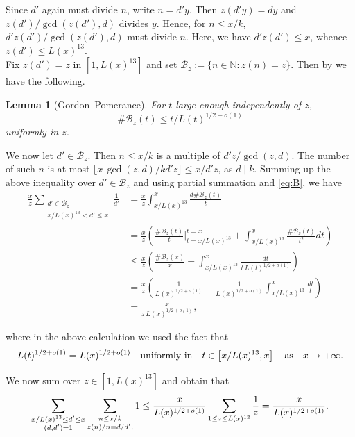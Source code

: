 \documentclass[12pt,a4paper,oneside]{amsart}
\newtheorem{lemma}[theorem]{Lemma}
\begin{document}
Since $d'$ again must divide $n$, write $n = d'y.$
Then $z(d'y) = dy$ and $z(d')/ \gcd(z(d'),d)$ divides $y$.
Hence, for $n \le x/k$, $d'z(d')/\gcd(z(d'),d)$ must divide $n.$
Here, we have $d'z(d')\le x$, whence $z(d')\le L(x)^{13}$. \\Fix $z(d')=z$ in $\left[1,L(x)^{13}\right]$ and set ${\mathcal B}_z:=\{n \in \mathbb N: z(n)=z\}.$ Then by \cite[Th. 3]{GP91} we have the following.
\begin{lemma}[Gordon--Pomerance]\label{gp}
For $t$ large enough independently of $z$,
\begin{equation}\label{eq:B}
\# \mathcal B_z(t) \le t/L(t)^{1/2+o(1)}
\end{equation}
uniformly in $z$.
\end{lemma}


We now let $d'\in {\mathcal B}_z$. Then $n\le x/k$ is a multiple of $d'z/\gcd(z,d)$. The  number of such $n$ is at most $\lfloor x\,\gcd(z,d)/kd'z\rfloor\le x/d'z$, as $d\mid k$. Summing up the above inequality over $d'\in {\mathcal B}_z$ and using partial summation and \eqref{eq:B}, we have
\begin{align*}
\frac{x}{z}\sum_{\substack{d'\in {\mathcal B}_z \\ x/L(x)^{13}<d'\le x}} \frac{1}{d'}  &=  \frac{x}{z}\int_{x/L(x)^{13}}^x \frac{d \# {\mathcal B}_z(t)}{t} 
\\ &=  \frac{x}{z}\left(\frac{\# {\mathcal B}_z(t)}{t}\Big|_{t=x/L(x)^{13}}^{t=x} +\int_{x/L(x)^{13}}^x \frac{\# {\mathcal B}_z(t)}{t^2} d t\right)
 \\&\leq  \frac{x}{z} \left(\frac{\# {\mathcal B}_z(x)}{x}+\int_{x/L(x)^{13}} ^x \frac{d t}{t\, L(t)^{1/2+o(1)}}\right)
\\&=  \frac{x}{z}\left(\frac{1}{L(x)^{1/2+o(1)}}+\frac{1}{L(x)^{1/2+o(1)}} \int_{x/L(x)^{13}}^x \frac{dt}{t}\right)
 \\&=   \frac{x}{z\, L(x)^{1/2+o(1)}},
\end{align*}

where in the above calculation we used the fact that 
\[
L(t)^{1/2+o(1)}=L(x)^{1/2+o(1)}\quad {\text{\rm uniformly~in}}\quad t\in \left[x/L(x)^{13},x\right]\quad {\text{\rm as}}\quad x\to+\infty.
\]

We now sum over $z\in \left[1,L(x)^{13}\right]$ and obtain that
\[ \sum_{\substack{x/L(x)^{13}\le d'\le x \\ (d,d')=1}}\sum_{\substack{n \le x/k\\ z(n)/n = d/d',\\ }}1\le \frac{x}{L(x)^{1/2+o(1)}}\sum_{1\le z\le L(x)^{13}} \frac{1}{z}\\ =\frac{x}{L(x)^{1/2+o(1)}}.\]
\end{document}
